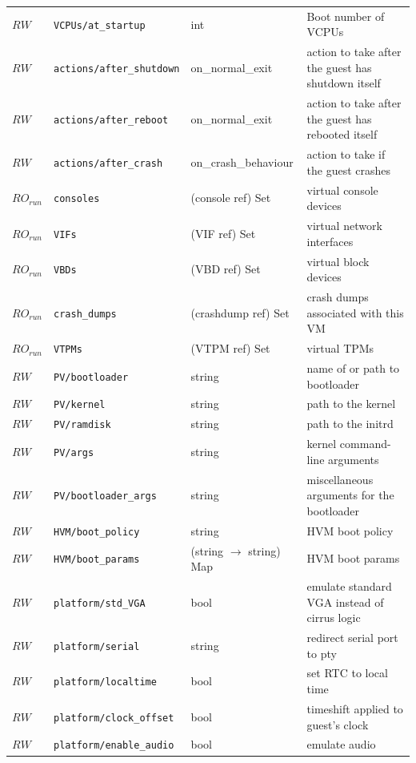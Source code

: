 \begin{longtable}{|lllp{}|}
$\mathit{RW}$ &  {\tt VCPUs/at\_startup} & int & Boot number of VCPUs \\
$\mathit{RW}$ &  {\tt actions/after\_shutdown} & on\_normal\_exit & action to take after the guest has shutdown itself \\
$\mathit{RW}$ &  {\tt actions/after\_reboot} & on\_normal\_exit & action to take after the guest has rebooted itself \\
$\mathit{RW}$ &  {\tt actions/after\_crash} & on\_crash\_behaviour & action to take if the guest crashes \\
$\mathit{RO}_\mathit{run}$ &  {\tt consoles} & (console ref) Set & virtual console devices \\
$\mathit{RO}_\mathit{run}$ &  {\tt VIFs} & (VIF ref) Set & virtual network interfaces \\
$\mathit{RO}_\mathit{run}$ &  {\tt VBDs} & (VBD ref) Set & virtual block devices \\
$\mathit{RO}_\mathit{run}$ &  {\tt crash\_dumps} & (crashdump ref) Set & crash dumps associated with this VM \\
$\mathit{RO}_\mathit{run}$ &  {\tt VTPMs} & (VTPM ref) Set & virtual TPMs \\
$\mathit{RW}$ &  {\tt PV/bootloader} & string & name of or path to bootloader \\
$\mathit{RW}$ &  {\tt PV/kernel} & string & path to the kernel \\
$\mathit{RW}$ &  {\tt PV/ramdisk} & string & path to the initrd \\
$\mathit{RW}$ &  {\tt PV/args} & string & kernel command-line arguments \\
$\mathit{RW}$ &  {\tt PV/bootloader\_args} & string & miscellaneous arguments for the bootloader \\
$\mathit{RW}$ &  {\tt HVM/boot\_policy} & string & HVM boot policy \\
$\mathit{RW}$ &  {\tt HVM/boot\_params} & (string $\rightarrow$ string) Map & HVM boot params \\
$\mathit{RW}$ &  {\tt platform/std\_VGA} & bool & emulate standard VGA instead of cirrus logic \\
$\mathit{RW}$ &  {\tt platform/serial} & string & redirect serial port to pty \\
$\mathit{RW}$ &  {\tt platform/localtime} & bool & set RTC to local time \\
$\mathit{RW}$ &  {\tt platform/clock\_offset} & bool & timeshift applied to guest's clock \\
$\mathit{RW}$ &  {\tt platform/enable\_audio} & bool & emulate audio \\

\end{longtable}
